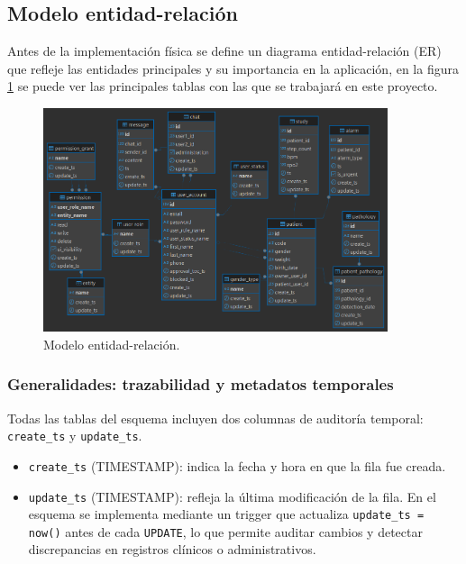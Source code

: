 \documentclass[12pt, a4paper]{article}
\begin{document}
\subsection{Modelo entidad-relación}

Antes de la implementación física se define un diagrama entidad-relación (ER) que refleje las entidades principales y su importancia en la aplicación, en la figura \ref{fig:db} se puede ver las principales tablas con las que se trabajará en este proyecto.


\begin{figure}[htbp]
	\centering
	\includegraphics[width=0.9\textwidth]{images/db_bracelet.png}
	\caption[Modelo entidad-relación]{Modelo entidad-relación.}
	\label{fig:db}
\end{figure}

\subsubsection{Generalidades: trazabilidad y metadatos temporales}

Todas las tablas del esquema incluyen dos columnas de auditoría temporal: \texttt{create\_ts} y \texttt{update\_ts}.  

\begin{itemize}
	\item \texttt{create\_ts} (TIMESTAMP): indica la fecha y hora en que la fila fue creada. 
	\item \texttt{update\_ts} (TIMESTAMP): refleja la última modificación de la fila. En el esquema se implementa mediante un trigger que actualiza \texttt{update\_ts = now()} antes de cada \texttt{UPDATE}, lo que permite auditar cambios y detectar discrepancias en registros clínicos o administrativos.
\end{itemize}
\end{document}
